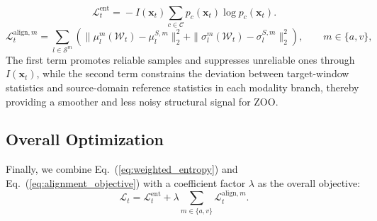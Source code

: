 \begin{equation}
\label{eq:weighted_entropy}
\mathcal L_t^{\mathrm{ent}}
=
\!- I(\mathbf{x}_t)\sum_{c\in \mathcal C} p_c(\mathbf{x}_t)\log p_c(\mathbf{x}_t).
\end{equation}
\begin{equation}
\label{eq:alignment_objective}
\mathcal L_t^{\mathrm{align},m}
=
\sum_{l\in \mathcal S^{m}}
\left(
\|\mu_l^{m}(\mathcal W_t)-\mu_l^{S,m}\|_2^2
+
\|\sigma_l^{m}(\mathcal W_t)-\sigma_l^{S,m}\|_2^2
\right),
\qquad m\in\{a,v\},
\end{equation}
The first term promotes reliable samples and suppresses unreliable ones through $I(\mathbf{x}_t)$, while the second term constrains the deviation between target-window statistics and source-domain reference statistics in each modality branch, thereby providing a smoother and less noisy structural signal for ZOO.

\subsection{Overall Optimization}
\label{sec:overall_opt}

Finally, we combine Eq.~(\ref{eq:weighted_entropy}) and Eq.~(\ref{eq:alignment_objective}) with a coefficient factor $\lambda$ as the overall objective:
\begin{equation}
\label{eq:signal_objective}
\mathcal L_t
=
\mathcal L_t^{\mathrm{ent}}
+
\lambda \sum_{m\in\{a,v\}} \mathcal L_t^{\mathrm{align},m}.
\end{equation}

